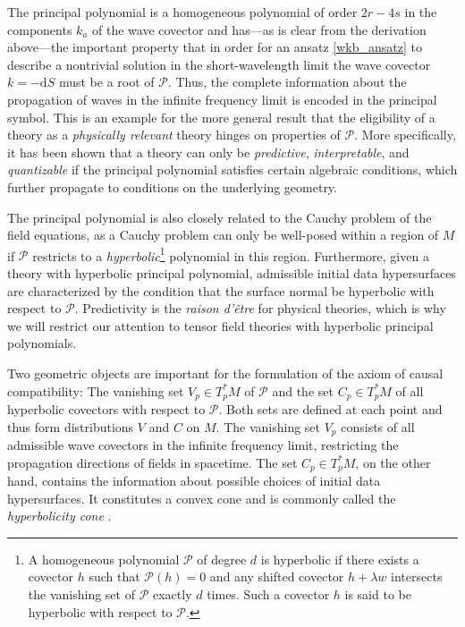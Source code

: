 The principal polynomial is a homogeneous polynomial of order $2r-4s$ in the components $k_a$ of the wave covector and has---as is clear from the derivation above---the important property that in order for an ansatz \eqref{wkb_ansatz} to describe a nontrivial solution in the short-wavelength limit the wave covector $k=-\mathrm dS$ must be a root of $\mathcal P$. Thus, the complete information about the propagation of waves in the infinite frequency limit is encoded in the principal symbol. This is an example for the more general result that the eligibility of a theory as a \emph{physically relevant} theory hinges on properties of $\mathcal P$. More specifically, it has been shown that a theory can only be \emph{predictive}, \emph{interpretable}, and \emph{quantizable} if the principal polynomial satisfies certain algebraic conditions, which further propagate to conditions on the underlying geometry. \cite{R_tzel_2011,Rivera_2012}

The principal polynomial is also closely related to the Cauchy problem of the field equations, as a Cauchy problem can only be well-posed within a region of $M$ if $\mathcal P$ restricts to a \emph{hyperbolic}\footnote{A homogeneous polynomial $\mathcal P$ of degree $d$ is hyperbolic if there exists a covector $h$ such that $\mathcal P(h)=0$ and any shifted covector $h+\lambda w$ intersects the vanishing set of $\mathcal P$ exactly $d$ times. Such a covector $h$ is said to be hyperbolic with respect to $\mathcal P$.} polynomial in this region. Furthermore, given a theory with hyperbolic principal polynomial, admissible initial data hypersurfaces are characterized by the condition that the surface normal be hyperbolic with respect to $\mathcal P$. \cite{H_rmander_1977,Ivrii_1974} Predictivity is the \emph{raison d'\^etre} for physical theories, which is why we will restrict our attention to tensor field theories with hyperbolic principal polynomials.

Two geometric objects are important for the formulation of the axiom of causal compatibility: The vanishing set $V_p\in T_p^\ast M$ of $\mathcal P$ and the set $C_p\in T_p^\ast M$ of all hyperbolic covectors with respect to $\mathcal P$. Both sets are defined at each point and thus form distributions $V$ and $C$ on $M$. The vanishing set $V_p$ consists of all admissible wave covectors in the infinite frequency limit, restricting the propagation directions of fields in spacetime. The set $C_p\in T_p^\ast M$, on the other hand, contains the information about possible choices of initial data hypersurfaces. It constitutes a convex cone\cite{Garding_1959} and is commonly called the \emph{hyperbolicity cone} \cite{R_tzel_2011,Rivera_2012}.

